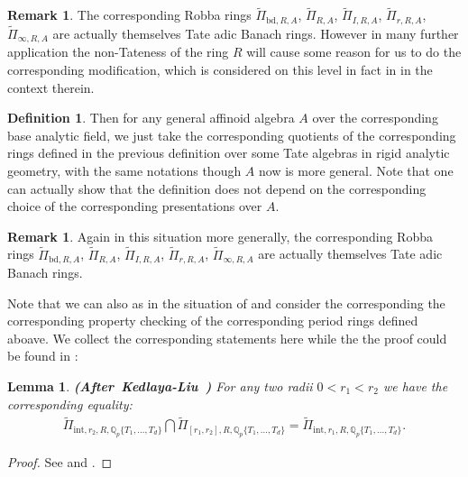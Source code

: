 \documentclass[12pt]{amsart}
\newtheorem{lemma}[theorem]{Lemma}
\theoremstyle{definition}
\newtheorem{definition}[theorem]{Definition}
\newtheorem{remark}[theorem]{Remark}
\numberwithin{equation}{section}
\begin{document}
\begin{remark}
The corresponding Robba rings $\widetilde{\Pi}_{\mathrm{bd},R,A}$, $\widetilde{\Pi}_{R,A}$, $\widetilde{\Pi}_{I,R,A}$, $\widetilde{\Pi}_{r,R,A}$, $\widetilde{\Pi}_{\infty,R,A}$ are actually themselves Tate adic Banach rings. However in many further application the non-Tateness of the ring $R$ will cause some reason for us to do the corresponding modification, which is considered on this level in fact in \cite{KL1} in the context therein.	
\end{remark}


\begin{definition}
Then for any general affinoid algebra $A$ over the corresponding base analytic field, we just take the corresponding quotients of the corresponding rings defined in the previous definition over some Tate algebras in rigid analytic geometry, with the same notations though $A$ now is more general. Note that one can actually show that the definition does not depend on the corresponding choice of the corresponding presentations over $A$.
\end{definition}



\begin{remark}
Again in this situation more generally, the corresponding Robba rings $\widetilde{\Pi}_{\mathrm{bd},R,A}$, $\widetilde{\Pi}_{R,A}$, $\widetilde{\Pi}_{I,R,A}$, $\widetilde{\Pi}_{r,R,A}$, $\widetilde{\Pi}_{\infty,R,A}$ are actually themselves Tate adic Banach rings.	
\end{remark}


\indent Note that we can also as in the situation of \cite{KL2} and \cite{XT2} consider the corresponding the corresponding property checking of the corresponding period rings defined aboave. We collect the corresponding statements here while the the proof could be found in \cite{XT2}:


\begin{lemma} \mbox{\bf{(After Kedlaya-Liu \cite[Lemma 5.2.6]{KL2})}}
For any two radii $0<r_1<r_2$ we have the corresponding equality:
\begin{align}
\widetilde{\Pi}_{\mathrm{int},r_2,R,\mathbb{Q}_p\{T_1,...,T_d\}}\bigcap \widetilde{\Pi}_{[r_1,r_2],R,\mathbb{Q}_p\{T_1,...,T_d\}}	=\widetilde{\Pi}_{\mathrm{int},r_1,R,\mathbb{Q}_p\{T_1,...,T_d\}}.
\end{align}

\end{lemma}


\begin{proof}
See \cite[Lemma 5.2.6]{KL2} and \cite[Proposition 2.13]{XT2}.	
\end{proof}
\end{document}
